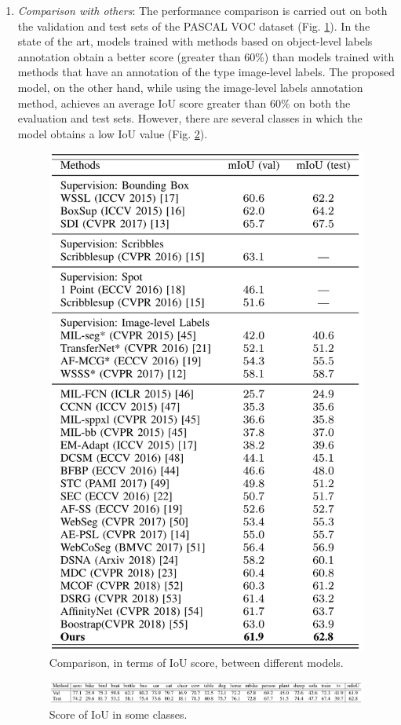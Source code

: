 \begin{enumerate}
    \item \emph{Comparison with others}: The performance comparison is carried out on both the validation and test sets of the PASCAL VOC dataset (Fig. \ref{fig:IoU score comparison}). In the state of the art, models trained with methods based on object-level labels annotation obtain a better score (greater than 60\%) than models trained with methods that have an annotation of the type image-level labels. The proposed model, on the other hand, while using the image-level labels annotation method, achieves an average IoU score greater than 60\% on both the evaluation and test sets. However, there are several classes in which the model obtains a low IoU value (Fig. \ref{fig:classes}).
    \begin{figure}[h!]
        \centering
        \includegraphics[width = 0.6 \linewidth]{images/paper6/comparison.png}
        \centering
        \caption{Comparison, in terms of IoU score, between different models.}
        \label{fig:IoU score comparison}
    \end{figure}
    \begin{figure}[h!]
        \centering
        \includegraphics[width = 1 \linewidth]{images/paper6/classes.png}
        \centering
        \caption{Score of IoU in some classes.}
        \label{fig:classes}
    \end{figure}
\end{enumerate}

